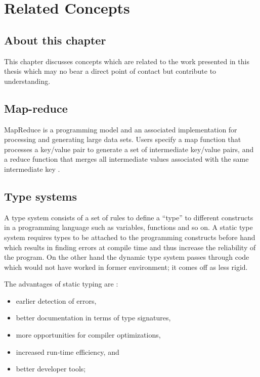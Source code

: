 \documentclass[proposal.tex]{subfiles}
\begin{document}
\chapter{Related Concepts}\label{chap:relatedWork}


\section{About this chapter}
This chapter discusses concepts which are related to the work presented in this thesis which may no bear a direct point of contact but 
contribute to understanding. 

\section{Map-reduce}

MapReduce is a programming model and an associated implementation for processing and generating large data sets. Users specify a map 
function that processes a key/value pair to generate a set of intermediate key/value pairs, and a reduce function that merges all 
intermediate values associated with the same intermediate key \cite{dean2008mapreduce}.

\section{Type systems}

A type system consists of a set of rules to define a ``type'' to different constructs in a
programming language such as variables, functions and so on.
A static type system requires types to be attached to the programming constructs before hand which results in
finding errors at compile time and thus increase the reliability of the program.
On the other hand the dynamic type system passes through code which would not have worked in former
environment; it comes off as less rigid.


The advantages of static typing \cite{meijer2004static} are :
\begin{itemize}
\item earlier detection of errors,
\item better documentation in terms of type signatures,
\item more opportunities for compiler optimizations,
\item increased run-time efficiency, and
\item better developer tools;
\end{itemize}
\end{document}
